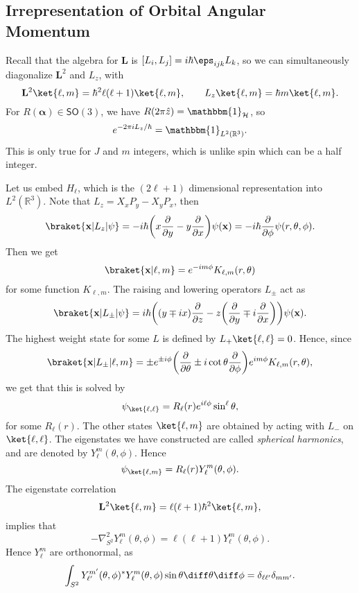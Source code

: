 \documentclass[12pt]{article}
\begin{document}
\subsection{Irrepresentation of Orbital Angular Momentum}
\label{sub:irrep_oam}

Recall that the algebra for $\mathbf{L}$ is $[L_i, L_j] = i \hbar \eps_{ijk} L_k$, so we can simultaneously diagonalize $\mathbf{L}^2$ and $L_z$, with
\[
	\mathbf{L}^2 \ket{\ell, m} = \hbar^2 \ell(\ell+1) \ket{\ell,m}, \qquad L_z\ket{\ell,m} = \hbar m \ket{\ell, m}.
\]
For $R(\bm{\alpha}) \in \mathsf{SO}(3)$, we have $R(2 \pi \hat z) = \mathbbm{1}_{\mathcal{H}}$, so
\[
e^{-2 \pi i L_z/\hbar} = \mathbbm{1}_{L^2(\mathbb{R}^3)}.
\]
This is only true for $J$ and $m$ integers, which is unlike spin which can be a half integer.

Let us embed $H_\ell$, which is the $(2\ell+1)$ dimensional representation into $L^2(\mathbb{R}^3)$. Note that $L_z = X_xP_y - X_yP_x$, then
\[
	\braket{\mathbf{x}|L_z|\psi} = -i\hbar \biggl( x \frac{\partial}{\partial y} - y \frac{\partial}{\partial x} \biggr) \psi(\mathbf{x}) = -i \hbar \frac{\partial}{\partial \phi} \psi(r, \theta, \phi).
\]
Then we get
\[
	\braket{\mathbf{x}|\ell,m} = e^{-i m \phi} K_{\ell,m}(r, \theta)
\]
for some function $K_{\ell,m}$. The raising and lowering operators $L_{\pm}$ act as
\[
	\braket{\mathbf{x}|L_{\pm}|\psi} = i \hbar \biggl( (y \mp ix) \frac{\partial}{\partial z} - z \biggl( \frac{\partial}{\partial y} \mp i \frac{\partial}{\partial x} \biggr) \biggr) \psi(\mathbf{x}).
\]
The highest weight state for some $L$ is defined by $L_+\ket{\ell,\ell} = 0$. Hence, since
\[
	\braket{\mathbf{x}|L_{\pm}|\ell,m} = \pm e^{\pm i \phi} \biggl( \frac{\partial}{\partial \theta} \pm i \cot \theta \frac{\partial}{\partial \phi} \biggr) e^{im \phi} K_{\ell,m}(r, \theta),
\]
we get that this is solved by
\[
	\psi_{\ket{\ell,\ell}} = R_\ell(r) e^{i \ell \phi} \sin^{\ell} \theta,
\]
for some $R_\ell(r)$. The other states $\ket{\ell,m}$ are obtained by acting with $L_-$ on $\ket{\ell, \ell}$. The eigenstates we have constructed are called \emph{spherical harmonics}, and are denoted by $Y_\ell^m(\theta, \phi)$. Hence
\[
	\psi_{\ket{\ell,m}} = R_\ell(r) Y_\ell^m (\theta, \phi).
\]
The eigenstate correlation
\[
	\mathbf{L}^2 \ket {\ell, m} = \ell(\ell+1)\hbar^2 \ket{\ell,m},
\]
implies that
\[
- \nabla^2_{S^2} Y_\ell^m (\theta, \phi) = \ell(\ell+1) Y_\ell^m(\theta, \phi).
\]
Hence $Y_\ell^m$ are orthonormal, as
\[
\int_{S^2} Y_{\ell'}^{m'} (\theta, \phi)^{\ast} Y_\ell^m(\theta, \phi) \sin \theta \diff \theta \diff \phi = \delta_{\ell\ell'} \delta_{mm'}.
\]
\end{document}

